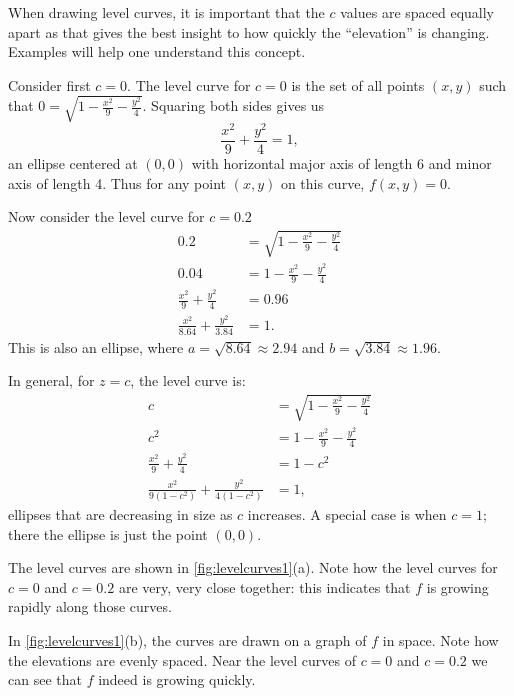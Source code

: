 When drawing level curves, it is important that the $c$ values are spaced equally apart as that gives the best insight to how quickly the ``elevation'' is changing. Examples will help one understand this concept.

{Consider first $c=0$. The level curve for $c=0$ is the set of all points $(x,y)$ such that $0=\sqrt{1-\frac{x^2}9-\frac{y^2}4}$. Squaring both sides  gives us
$$\frac{x^2}9+\frac{y^2}4=1,$$ an ellipse centered at $(0,0)$ with horizontal major axis of length 6 and minor axis of length 4. Thus for any point $(x,y)$ on this curve, $f(x,y) = 0$.

Now consider the level curve for $c=0.2$
\begin{align*}
0.2 &= \sqrt{1-\frac{x^2}9-\frac{y^2}4}\\
0.04 &= 1-\frac{x^2}9-\frac{y^2}4\\
\frac{x^2}9+\frac{y^2}4 &=0.96\\
\frac{x^2}{8.64}+\frac{y^2}{3.84} &=1.
\end{align*}
This is also an ellipse, where $a = \sqrt{8.64}\approx 2.94$ and $b=\sqrt{3.84}\approx 1.96$.

In general, for $z=c$, the level curve is:
\begin{align*}
c &= \sqrt{1-\frac{x^2}9-\frac{y^2}4}\\
c^2 &= 1-\frac{x^2}9-\frac{y^2}4\\
\frac{x^2}9+\frac{y^2}4 &=1-c^2\\
\frac{x^2}{9(1-c^2)}+\frac{y^2}{4(1-c^2)} &=1,
\end{align*}
ellipses that are decreasing in size as $c$ increases. A special case is when $c=1$; there the ellipse is just the point $(0,0)$. 


The level curves are shown in \autoref{fig:levelcurves1}(a). Note how the level curves for $c=0$ and $c=0.2$ are very, very close together: this indicates that $f$ is growing rapidly along those curves.

In \autoref{fig:levelcurves1}(b), the curves are drawn on a graph of $f$ in space. Note how the elevations are evenly spaced. Near the level curves of $c=0$ and $c=0.2$ we can see that $f$ indeed is growing quickly.}

